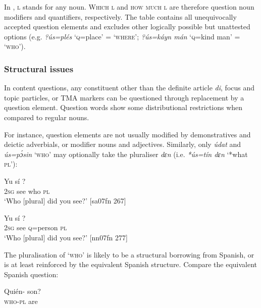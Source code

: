 In , \textsc{l} stands for any noun. W\textsc{hich} \textsc{l} and \textsc{how} \textsc{much} \textsc{l} are therefore question noun modifiers and quantifiers, respectively. The table contains all unequivocally accepted question elements and excludes other logically possible but unattested options (e.g. \textit{?ús=plés} ‘\textsc{q}=place’ = ‘\textsc{where’}; \textit{?ús=káyn mán} ‘\textsc{q}=kind man’ = ‘\textsc{who’}).


\subsubsection{Structural issues}

In content questions, any constituent other than the definite article \textit{di}, focus and topic particles, or TMA markers can be questioned through replacement by a question element. Question words show some distributional restrictions when compared to regular nouns. 


For instance, question elements are not usually modified by demonstratives and deictic adverbials, or modifier nouns and adjectives. Similarly, only \textit{údat} and \textit{ús=pɔ́sin} ‘\textsc{who’} may optionally take the pluraliser \textit{dɛn} (i.e. \textit{*ús=tín dɛn} ‘*what \textsc{pl}’): 



\ea%
    \label{ex:key:585}
    \gll Yu  sí    ?\\
\textsc{2sg}  see  who    \textsc{pl}\\

\glt ‘Who [plural] did you see?’ [sa07fn 267]
\z


\ea%
    \label{ex:key:586}
    \gll Yu  sí      ?\\
\textsc{2sg}  see  \textsc{q}=person    \textsc{pl}\\

\glt ‘Who [plural] did you see?’ [nn07fn 277]
\z

The pluralisation of ‘\textsc{who’} is likely to be a structural borrowing from Spanish, or is at least reinforced by the equivalent Spanish structure. Compare the equivalent Spanish question:


\ea%
    \label{ex:key:587}
    \gll Quién-    son?\\
\textsc{who}{}-\textsc{pl}    are\\

